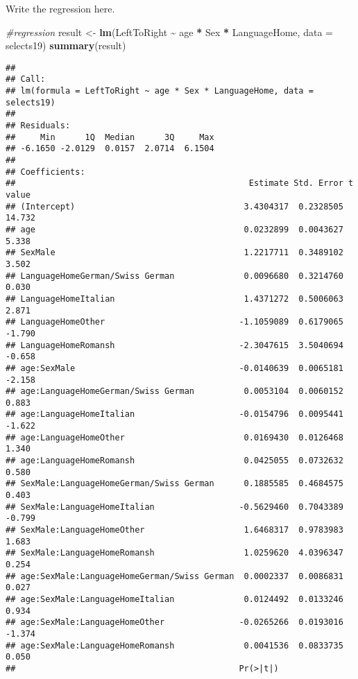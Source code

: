 \documentclass[
]{book}
\newenvironment{Shaded}{\begin{snugshade}}{\end{snugshade}}
\newcommand{\AttributeTok}[1]{\textcolor[rgb]{0.13,0.29,0.53}{#1}}
\newcommand{\CommentTok}[1]{\textcolor[rgb]{0.56,0.35,0.01}{\textit{#1}}}
\newcommand{\FunctionTok}[1]{\textcolor[rgb]{0.13,0.29,0.53}{\textbf{#1}}}
\newcommand{\NormalTok}[1]{#1}
\newcommand{\OtherTok}[1]{\textcolor[rgb]{0.56,0.35,0.01}{#1}}
\newcommand{\SpecialCharTok}[1]{\textcolor[rgb]{0.81,0.36,0.00}{\textbf{#1}}}
\begin{document}
Write the regression here.

\begin{Shaded}
\begin{Highlighting}[]
\CommentTok{\#regression}
\NormalTok{result }\OtherTok{\textless{}{-}} \FunctionTok{lm}\NormalTok{(LeftToRight }\SpecialCharTok{\textasciitilde{}}\NormalTok{ age }\SpecialCharTok{*}\NormalTok{ Sex }\SpecialCharTok{*}\NormalTok{ LanguageHome, }\AttributeTok{data =}\NormalTok{ selects19)}
\FunctionTok{summary}\NormalTok{(result)}
\end{Highlighting}
\end{Shaded}

\begin{verbatim}
## 
## Call:
## lm(formula = LeftToRight ~ age * Sex * LanguageHome, data = selects19)
## 
## Residuals:
##     Min      1Q  Median      3Q     Max 
## -6.1650 -2.0129  0.0157  2.0714  6.1504 
## 
## Coefficients:
##                                               Estimate Std. Error t value
## (Intercept)                                  3.4304317  0.2328505  14.732
## age                                          0.0232899  0.0043627   5.338
## SexMale                                      1.2217711  0.3489102   3.502
## LanguageHomeGerman/Swiss German              0.0096680  0.3214760   0.030
## LanguageHomeItalian                          1.4371272  0.5006063   2.871
## LanguageHomeOther                           -1.1059089  0.6179065  -1.790
## LanguageHomeRomansh                         -2.3047615  3.5040694  -0.658
## age:SexMale                                 -0.0140639  0.0065181  -2.158
## age:LanguageHomeGerman/Swiss German          0.0053104  0.0060152   0.883
## age:LanguageHomeItalian                     -0.0154796  0.0095441  -1.622
## age:LanguageHomeOther                        0.0169430  0.0126468   1.340
## age:LanguageHomeRomansh                      0.0425055  0.0732632   0.580
## SexMale:LanguageHomeGerman/Swiss German      0.1885585  0.4684575   0.403
## SexMale:LanguageHomeItalian                 -0.5629460  0.7043389  -0.799
## SexMale:LanguageHomeOther                    1.6468317  0.9783983   1.683
## SexMale:LanguageHomeRomansh                  1.0259620  4.0396347   0.254
## age:SexMale:LanguageHomeGerman/Swiss German  0.0002337  0.0086831   0.027
## age:SexMale:LanguageHomeItalian              0.0124492  0.0133246   0.934
## age:SexMale:LanguageHomeOther               -0.0265266  0.0193016  -1.374
## age:SexMale:LanguageHomeRomansh              0.0041536  0.0833735   0.050
##                                             Pr(>|t|)    

\end{verbatim}
\end{document}
